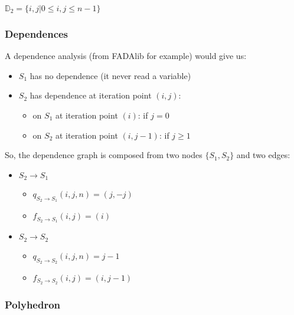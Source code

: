 $\mathbb{D}_{2} = \{ i, j | 0 \leq i, j \leq n - 1 \}$

			\subsubsection{Dependences}

A dependence analysis (from FADAlib for example) would give us:
\begin{itemize}
	\item $S_{1}$ has no dependence (it never read a variable)
	\item $S_{2}$ has dependence at iteration point $( i, j )$:
	\begin{itemize}
		\item on $S_{1}$ at iteration point $( i )$: if $j = 0$ 
		\item on $S_{2}$ at iteration point $( i, j - 1 )$: if $j \geq 1$ 
	\end{itemize}
\end{itemize}

So, the dependence graph is composed from two nodes $\{S_{1}, S_{2}\}$ and two edges:
\begin{itemize}
	\item $S_{2} \rightarrow S_{1}$
	\begin{itemize}
		\item $q_{S_{2} \rightarrow S_{1}}(i, j, n) = (j, -j)$
		\item $f_{S_{2} \rightarrow S_{1}}(i, j) = (i)$
	\end{itemize}
	\item $S_{2} \rightarrow S_{2}$
	\begin{itemize}
		\item $q_{S_{2} \rightarrow S_{2}}(i, j, n) = j - 1$
		\item $f_{S_{2} \rightarrow S_{2}}(i, j) = (i, j - 1)$
	\end{itemize}
\end{itemize}

			\subsubsection{Polyhedron}

